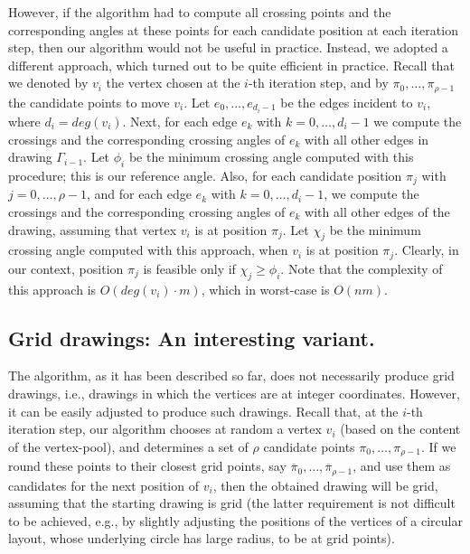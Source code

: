 \documentclass[runningheads]{llncs}
\begin{document}
However, if the algorithm had to compute all crossing points and the corresponding angles at these points for each candidate position at each iteration step, then our algorithm would not be useful in practice. Instead, we adopted a different approach, which turned out to be quite efficient in practice. Recall that we denoted by $v_i$ the vertex chosen at the $i$-th iteration step, and by $\pi_0,\ldots,\pi_{\rho-1}$ the candidate points to move $v_i$. Let $e_0,\ldots,e_{d_i-1}$ be the edges incident to $v_i$, where $d_i=deg(v_i)$. Next, for each edge $e_k$ with $k=0,\ldots,d_i-1$  we compute the crossings and the corresponding crossing angles of $e_k$ with all other edges in drawing $\Gamma_{i-1}$. Let $\phi_i$ be the minimum crossing angle computed with this procedure; this is our reference angle. Also, for each candidate position $\pi_j$ with $j=0,\ldots,\rho-1$, and for each edge $e_k$ with $k=0,\ldots,d_i-1$, we compute the crossings and the corresponding crossing angles of $e_k$ with all other edges of the drawing, assuming that vertex $v_i$ is at position $\pi_j$. Let $\chi_j$ be the minimum crossing angle computed with this approach, when $v_i$ is at position $\pi_j$. Clearly, in our context, position $\pi_j$ is feasible only if $\chi_j \geq \phi_i$. Note that the complexity of this approach is $O(deg(v_i) \cdot m)$, which in worst-case is $O(nm)$. 

\subsection{Grid drawings: An interesting variant.}
\label{ssec:grid}

The algorithm, as it has been described so far, does not necessarily produce grid drawings, i.e., drawings in which the vertices are at integer coordinates. However, it can be easily adjusted to produce such drawings. Recall that, at the $i$-th iteration step, our algorithm chooses at random a vertex $v_i$ (based on the content of the vertex-pool), and determines a set of $\rho$ candidate points $\pi_0,\ldots,\pi_{\rho-1}$. If we round these points to their closest grid points, say $\overline{\pi}_0,\ldots,\overline{\pi}_{\rho-1}$, and use them as candidates for the next position of $v_i$, then the obtained drawing will be grid, assuming that the starting drawing is grid (the latter requirement is not difficult to be achieved, e.g., by slightly adjusting the positions of the vertices of a circular layout, whose underlying circle has large radius, to be at grid points). 
\end{document}
